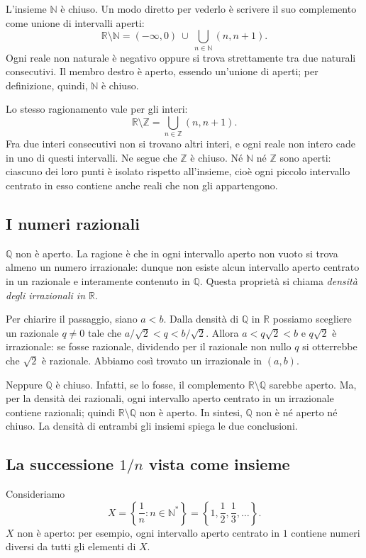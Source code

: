 \documentclass[11pt,a4paper]{article}
\newcommand{\R}{\mathbb{R}}
\newcommand{\N}{\mathbb{N}}
\newcommand{\Z}{\mathbb{Z}}
\newcommand{\Q}{\mathbb{Q}}
\begin{document}
L'insieme $\N$ è chiuso. Un modo diretto per vederlo è scrivere il suo
complemento come unione di intervalli aperti:
\[
  \R\setminus\N=(-\infty,0)\ \cup\
  \bigcup_{n\in\N}(n,n+1).
\]
Ogni reale non naturale è negativo oppure si trova strettamente tra due
naturali consecutivi. Il membro destro è aperto, essendo un'unione di aperti;
per definizione, quindi, $\N$ è chiuso.

Lo stesso ragionamento vale per gli interi:
\[
  \R\setminus\Z=\bigcup_{n\in\Z}(n,n+1).
\]
Fra due interi consecutivi non si trovano altri interi, e ogni reale non
intero cade in uno di questi intervalli. Ne segue che $\Z$ è chiuso.
Né $\N$ né $\Z$ sono aperti: ciascuno dei loro punti è isolato rispetto
all'insieme, cioè ogni piccolo intervallo centrato in esso contiene anche
reali che non gli appartengono.

\subsection{I numeri razionali}

$\Q$ non è aperto. La ragione è che in ogni intervallo aperto non vuoto
si trova almeno un numero irrazionale: dunque non esiste alcun intervallo
aperto centrato in un razionale e interamente contenuto in $\Q$.
Questa proprietà si chiama \emph{densità degli irrazionali in $\R$}.

Per chiarire il passaggio, siano $a<b$. Dalla densità di $\Q$ in $\R$
possiamo scegliere un razionale $q\ne0$ tale che
$a/\sqrt2<q<b/\sqrt2$. Allora $a<q\sqrt2<b$ e $q\sqrt2$ è irrazionale:
se fosse razionale, dividendo per il razionale non nullo $q$ si otterrebbe
che $\sqrt2$ è razionale. Abbiamo così trovato un irrazionale in $(a,b)$.

Neppure $\Q$ è chiuso. Infatti, se lo fosse, il complemento
$\R\setminus\Q$ sarebbe aperto. Ma, per la densità dei razionali,
ogni intervallo aperto centrato in un irrazionale contiene razionali;
quindi $\R\setminus\Q$ non è aperto. In sintesi, $\Q$ non è né aperto
né chiuso. La densità di entrambi gli insiemi spiega le due conclusioni.

\subsection{La successione $1/n$ vista come insieme}

Consideriamo
\[
  X=\left\{\frac1n:n\in\N^*\right\}
   =\left\{1,\frac12,\frac13,\ldots\right\}.
\]
$X$ non è aperto: per esempio, ogni intervallo aperto centrato in $1$
contiene numeri diversi da tutti gli elementi di $X$.
\end{document}
